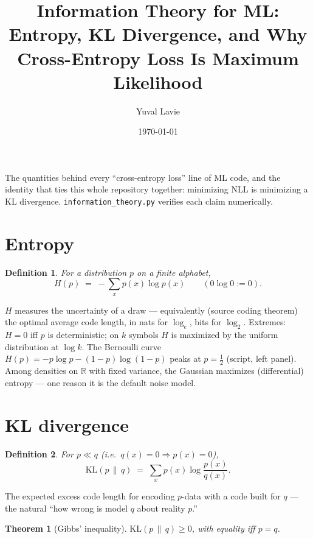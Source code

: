 \documentclass[11pt]{article}
\title{Information Theory for ML:\\
Entropy, KL Divergence, and Why Cross-Entropy Loss Is Maximum Likelihood}
\author{Yuval Lavie}
\date{\today}
\newtheorem{theorem}{Theorem}
\newtheorem{definition}{Definition}
\begin{document}
\maketitle

\noindent
The quantities behind every ``cross-entropy loss'' line of ML code, and
the identity that ties this whole repository together: minimizing NLL is
minimizing a KL divergence. \texttt{information\_theory.py} verifies each
claim numerically.

\section{Entropy}

\begin{definition}
For a distribution $p$ on a finite alphabet,
\begin{equation}
  H(p) \;=\; -\sum_x p(x)\log p(x)
  \qquad (0\log 0 := 0).
  \label{eq:entropy}
\end{equation}
\end{definition}

$H$ measures the uncertainty of a draw --- equivalently (source coding
theorem) the optimal average code length, in nats for $\log_e$, bits for
$\log_2$. Extremes: $H = 0$ iff $p$ is deterministic; on $k$ symbols $H$
is maximized by the uniform distribution at $\log k$. The Bernoulli curve
$H(p) = -p\log p - (1-p)\log(1-p)$ peaks at $p=\tfrac12$ (script, left
panel). Among densities on $\mathbb{R}$ with fixed variance, the Gaussian
maximizes (differential) entropy --- one reason it is the default noise
model.

\section{KL divergence}

\begin{definition}
For $p \ll q$ (i.e.\ $q(x)=0 \Rightarrow p(x)=0$),
\begin{equation}
  \mathrm{KL}(p \,\|\, q) \;=\; \sum_x p(x) \log\frac{p(x)}{q(x)} .
  \label{eq:kl}
\end{equation}
\end{definition}

The expected excess code length for encoding $p$-data with a code built
for $q$ --- the natural ``how wrong is model $q$ about reality $p$.''

\begin{theorem}[Gibbs' inequality]
$\mathrm{KL}(p\,\|\,q) \ge 0$, with equality iff $p = q$.
\end{theorem}
\end{document}

